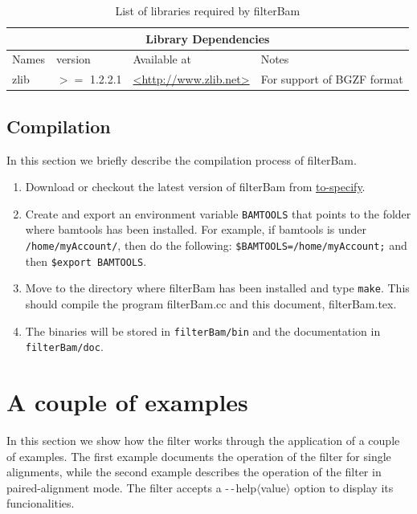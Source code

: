\documentclass[11pt]{article}
\newcommand{\printOption}[1]{$\textrm{-\,-}${\fontfamily{phv}\selectfont#1}$\langle${\fontfamily{phv}\selectfont value}$\rangle$}
\newcommand{\software}[1]{{\fontfamily{cmss}\selectfont#1}}
\newcommand{\unix}[1]{\texttt{#1}}
\begin{document}
{\begin{table}
  \begin{center}
    \begin{tabular}{|l|l|l|l|}
	\hline
	\multicolumn{4}{|c|}{Library Dependencies} \\ \cline{1-4}
	\hline
	  Names		&  version  & Available at	&	Notes\\ \cline{1-4}
	  zlib		&  $>=$ 1.2.2.1 & \url{<http://www.zlib.net>} & For support of BGZF format\\ \cline{1-4}
    \end{tabular}
  \end{center}
  \caption{List of libraries required by filterBam}
  \label{tab:libraries}
\end{table}


\subsection{Compilation}

In this section we briefly describe the compilation process of \software{filterBam}. 

\begin{enumerate}
	\item
		Download or checkout the latest version of filterBam from \url{to-specify}. 
	\item
		Create and export an environment variable \unix{BAMTOOLS} that points to the folder where 
		\software{bamtools} has been installed. For example, if \software{bamtools} is under 
		\unix{/home/myAccount/}, then do the following: \unix{\$BAMTOOLS=/home/myAccount;} and then 
		\unix{\$export BAMTOOLS}. 		
	\item
		Move to the directory where filterBam has been installed and type \unix{make}. This should compile 
		the program filterBam.cc and this document, filterBam.tex.
	\item
		The binaries will be stored in \unix{filterBam/bin} and the documentation in \unix{filterBam/doc}. 
\end{enumerate}

\section{A couple of examples}
In this section we show how the filter works through the application of a couple of examples. The first 
example documents the operation of the filter for single alignments, while the second example describes 
the operation of the filter in paired-alignment mode. The filter accepts a \printOption{help} option to 
display its funcionalities.

}
\end{document}
